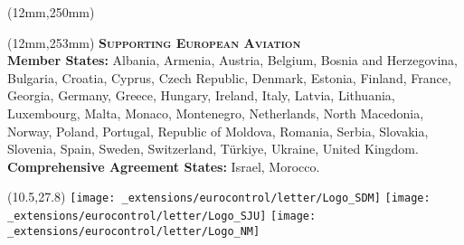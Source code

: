 {  \begin{textblock*}{186mm}(12mm,250mm)
    \ecrule[prussianblue]{\hsize}{1pt}
  \end{textblock*}

  \begin{textblock*}{186mm}(12mm,253mm)
  {%
    \fontsize{10}{5}\selectfont\sffamily
    \textsc{\textbf{\textcolor{prussianblue}{Supporting European Aviation}}}\\
    \fontsize{9}{5}\selectfont\sffamily\color[gray]{0.3}
    \textbf{Member States:} Albania, Armenia, Austria, Belgium, Bosnia and Herzegovina, Bulgaria,
    Croatia, Cyprus, Czech Republic, Denmark, Estonia, Finland, France, Georgia, Germany, Greece,
    Hungary, Ireland, Italy, Latvia, Lithuania, Luxembourg, Malta, Monaco, Montenegro, Netherlands,
    North Macedonia, Norway, Poland, Portugal, Republic of Moldova, Romania, Serbia, Slovakia,
    Slovenia, Spain, Sweden, Switzerland, Türkiye, Ukraine, United Kingdom.
    \\
    \textbf{Comprehensive Agreement States:} Israel, Morocco.
  }
  \end{textblock*}


  \begin{textblock}{9.5}(10.5,27.8)\hfill
    \texttt{[image: \_extensions/eurocontrol/letter/Logo\_SDM]}\hspace{5mm}
    \texttt{[image: \_extensions/eurocontrol/letter/Logo\_SJU]}\hspace{3.5mm}
    \texttt{[image: \_extensions/eurocontrol/letter/Logo\_NM]}
  \end{textblock}



}


\makeatletter
{}
\makeatother


\usepackage{fancyhdr}
\usepackage{lastpage}

\pagestyle{fancy}


\flagsdefault[width=4mm]

